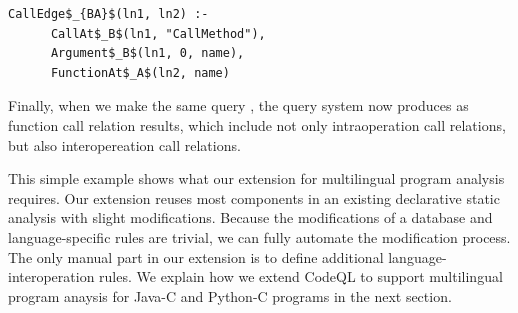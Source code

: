 
\begin{lstlisting}[style=mrule]
    CallEdge$_{BA}$(ln1, ln2) :-
      CallAt$_B$(ln1, "CallMethod"),
      Argument$_B$(ln1, 0, name),
      FunctionAt$_A$(ln2, name)
\end{lstlisting}

%

Finally, when we make the same query , the query system
now produces  as function call relation results,
which include not only intraoperation call relations,
but also interopereation call relations. 

This simple example shows what our extension for multilingual program analysis
requires. Our extension reuses most components in an existing declarative static
analysis with slight modifications. Because the modifications of a database and
language-specific rules are trivial, we can fully automate the modification
process.  The only manual part in our extension is to define additional
language-interoperation rules. We explain how we extend CodeQL to support
multilingual program anaysis for Java-C and Python-C programs in the next section.


